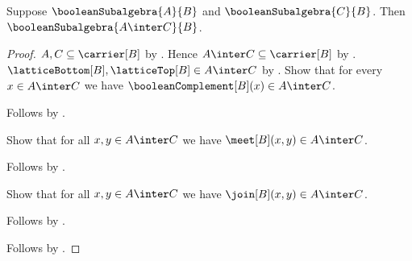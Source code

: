 \begin{theorem}\label{boolean_subalgebra_intersection}
    Suppose $\booleanSubalgebra{A}{B}$ and
        $\booleanSubalgebra{C}{B}$.
    Then $\booleanSubalgebra{A\inter C}{B}$.
\end{theorem}
\begin{proof}
    $A,C\subseteq\carrier[B]$ by .
    Hence $A\inter C\subseteq\carrier[B]$ by .
    $\latticeBottom[B],\latticeTop[B]\in A\inter C$ by
        .
    Show that for every $x\in A\inter C$ we have
        $\booleanComplement[B](x)\in A\inter C$.
    \begin{subproof}
        Follows by
            .
    \end{subproof}
    Show that for all $x,y\in A\inter C$ we have
        $\meet[B](x,y)\in A\inter C$.
    \begin{subproof}
        Follows by
            .
    \end{subproof}
    Show that for all $x,y\in A\inter C$ we have
        $\join[B](x,y)\in A\inter C$.
    \begin{subproof}
        Follows by
            .
    \end{subproof}
    Follows by .
\end{proof}

